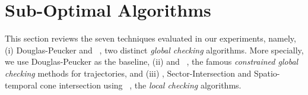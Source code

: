 \newtheorem{theorem}{Theorem}
\newtheorem{lemma}{Lemma}

\vspace{-1ex}
\section{Sub-Optimal Algorithms}
\label{sec-subopt}



This section reviews the seven techniques evaluated in our experiments, namely,
(i) Douglas-Peucker\cite{Douglas:Peucker} and \pavlidis~\cite{Pavlidis:Segment}, two distinct \emph{global checking} algorithms.
More specially, we use Douglas-Peucker as the baseline,
(ii) \bqsa\cite{Liu:BQS} and \squishe~\cite{Muckell:SQUISH}, the famous \emph{constrained global checking} methods for trajectories, %
and (iii) \operb\cite{Lin:Operb}, Sector-Intersection\cite{Williams:Longest,Sklansky:Cone,Dunham:Cone, Zhao:Sleeve} and Spatio-temporal cone intersection using \sed~\cite{Lin:Cised}, the \emph{local checking} algorithms.




